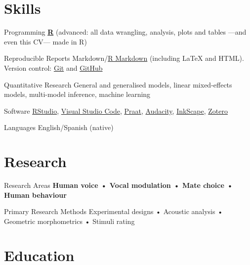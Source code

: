 \documentclass[11pt,a4paper,]{awesome-cv}
\begin{document}
\hypertarget{skills}{%
\section{Skills}\label{skills}}

\begin{cvskills}
  \cvskill
    {Programming}
    {\href{https://www.r-project.org/}{\textbf{R}} (advanced: all data wrangling, analysis, plots and tables —and even this CV— made in R)}

  \cvskill
    {Reproducible Reports}
    {Markdown/\href{https://rmarkdown.rstudio.com/}{R Markdown} (including {\selectfont\LaTeX} and HTML). Version control: \href{https://git-scm.com/}{Git} \faGit* and \href{https://github.com/JDLeongomez}{GitHub} \faGithub}

  \cvskill
    {Quantitative Research}
    {General and generalised models, linear mixed-effects models, multi-model inference, machine learning}

  \cvskill
    {Software}
    {\href{https://posit.co/products/open-source/rstudio/}{RStudio}, \href{https://code.visualstudio.com/}{Visual Studio Code}, \href{https://www.fon.hum.uva.nl/praat/}{Praat}, \href{https://www.audacityteam.org/}{Audacity}, \href{https://inkscape.org/}{InkScape}, \href{https://www.zotero.org/}{Zotero}}

  \cvskill
    {Languages}
    {English/Spanish (native)}
\end{cvskills}

\hypertarget{research}{%
\section{Research}\label{research}}

\begin{cvskills}
  \cvskill
    {Research Areas}
    {\textbf{Human voice • Vocal modulation • Mate choice • Human behaviour}}

  \cvskill
    {Primary Research Methods}
    {Experimental designs • Acoustic analysis • Geometric morphometrics • Stimuli rating}
\end{cvskills}

\hypertarget{education}{%
\section{Education}\label{education}}
\end{document}
